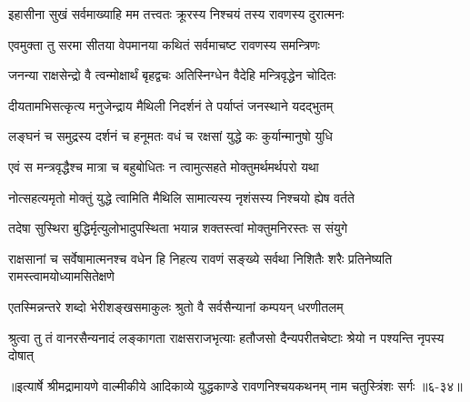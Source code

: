 \twolineshloka
{इहासीना सुखं सर्वमाख्याहि मम तत्त्वतः}
{क्रूरस्य निश्चयं तस्य रावणस्य दुरात्मनः} %

\twolineshloka
{एवमुक्ता तु सरमा सीतया वेपमानया}
{कथितं सर्वमाचष्ट रावणस्य समन्त्रिणः} %

\twolineshloka
{जनन्या राक्षसेन्द्रो वै त्वन्मोक्षार्थं बृहद्वचः}
{अतिस्निग्धेन वैदेहि मन्त्रिवृद्धेन चोदितः} %

\twolineshloka
{दीयतामभिसत्कृत्य मनुजेन्द्राय मैथिली}
{निदर्शनं ते पर्याप्तं जनस्थाने यदद्भुतम्} %

\twolineshloka
{लङ्घनं च समुद्रस्य दर्शनं च हनूमतः}
{वधं च रक्षसां युद्धे कः कुर्यान्मानुषो युधि} %

\twolineshloka
{एवं स मन्त्रवृद्धैश्च मात्रा च बहुबोधितः}
{न त्वामुत्सहते मोक्तुमर्थमर्थपरो यथा} %

\twolineshloka
{नोत्सहत्यमृतो मोक्तुं युद्धे त्वामिति मैथिलि}
{सामात्यस्य नृशंसस्य निश्चयो ह्येष वर्तते} %

\twolineshloka
{तदेषा सुस्थिरा बुद्धिर्मृत्युलोभादुपस्थिता}
{भयान्न शक्तस्त्वां मोक्तुमनिरस्तः स संयुगे} %

\threelineshloka
{राक्षसानां च सर्वेषामात्मनश्च वधेन हि}
{निहत्य रावणं सङ्ख्ये सर्वथा निशितैः शरैः}
{प्रतिनेष्यति रामस्त्वामयोध्यामसितेक्षणे} %

\twolineshloka
{एतस्मिन्नन्तरे शब्दो भेरीशङ्खसमाकुलः}
{श्रुतो वै सर्वसैन्यानां कम्पयन् धरणीतलम्} %

\twolineshloka
{श्रुत्वा तु तं वानरसैन्यनादं लङ्कागता राक्षसराजभृत्याः}
{हतौजसो दैन्यपरीतचेष्टाः श्रेयो न पश्यन्ति नृपस्य दोषात्} %


॥इत्यार्षे श्रीमद्रामायणे वाल्मीकीये आदिकाव्ये युद्धकाण्डे रावणनिश्चयकथनम् नाम चतुस्त्रिंशः सर्गः ॥६-३४॥
